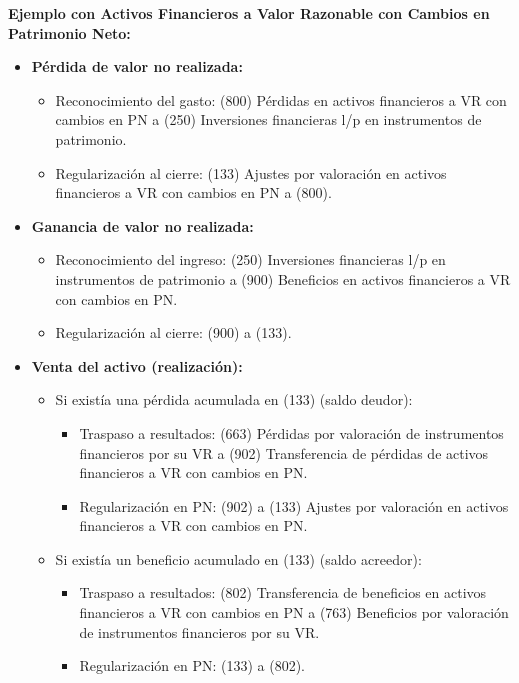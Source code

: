\documentclass[
  paper=a4,
  ,captions=tableheading
]{scrbook}
\providecommand{\tightlist}{%
  \setlength{\itemsep}{0pt}\setlength{\parskip}{0pt}}
\begin{document}
\textbf{Ejemplo con Activos Financieros a Valor Razonable con Cambios en
Patrimonio Neto:}

\begin{itemize}
\tightlist
\item
  \textbf{Pérdida de valor no realizada:}

  \begin{itemize}
  \tightlist
  \item
    Reconocimiento del gasto: (800) Pérdidas en activos financieros a VR
    con cambios en PN a (250) Inversiones financieras l/p en
    instrumentos de patrimonio.
  \item
    Regularización al cierre: (133) Ajustes por valoración en activos
    financieros a VR con cambios en PN a (800).
  \end{itemize}
\item
  \textbf{Ganancia de valor no realizada:}

  \begin{itemize}
  \tightlist
  \item
    Reconocimiento del ingreso: (250) Inversiones financieras l/p en
    instrumentos de patrimonio a (900) Beneficios en activos financieros
    a VR con cambios en PN.
  \item
    Regularización al cierre: (900) a (133).
  \end{itemize}
\item
  \textbf{Venta del activo (realización):}

  \begin{itemize}
  \tightlist
  \item
    Si existía una pérdida acumulada en (133) (saldo deudor):

    \begin{itemize}
    \tightlist
    \item
      Traspaso a resultados: (663) Pérdidas por valoración de
      instrumentos financieros por su VR a (902) Transferencia de
      pérdidas de activos financieros a VR con cambios en PN.
    \item
      Regularización en PN: (902) a (133) Ajustes por valoración en
      activos financieros a VR con cambios en PN.
    \end{itemize}
  \item
    Si existía un beneficio acumulado en (133) (saldo acreedor):

    \begin{itemize}
    \tightlist
    \item
      Traspaso a resultados: (802) Transferencia de beneficios en
      activos financieros a VR con cambios en PN a (763) Beneficios por
      valoración de instrumentos financieros por su VR.
    \item
      Regularización en PN: (133) a (802).
    \end{itemize}
  \end{itemize}
\end{itemize}
\end{document}
